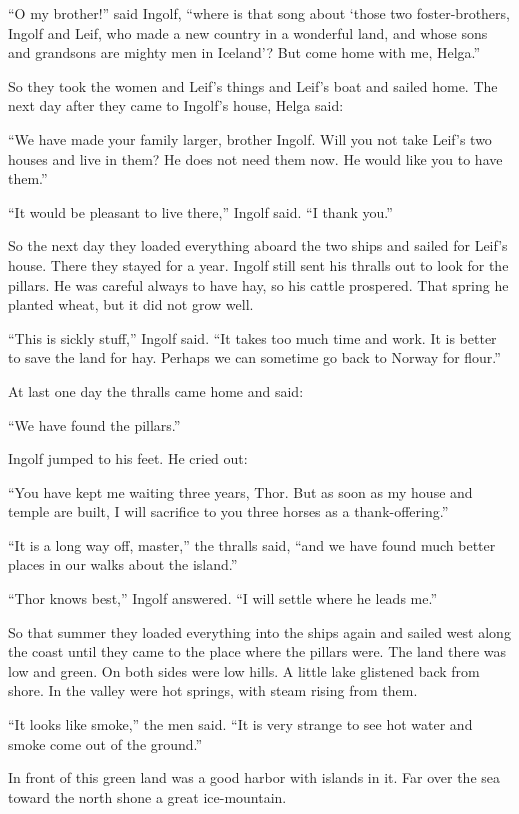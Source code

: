 ``O my brother!'' said Ingolf, ``where is that song about `those two
foster-brothers, Ingolf and Leif, who made a new country in a wonderful
land, and whose sons and grandsons are mighty men in Iceland'? But come
home with me, Helga.''

So they took the women and Leif's things and Leif's boat and sailed
home. The next day after they came to Ingolf's house, Helga said:

``We have made your family larger, brother Ingolf. Will you not take
Leif's two houses and live in them? He does not need them now. He would
like you to have them.''

``It would be pleasant to live there,'' Ingolf said. ``I thank you.''

So the next day they loaded everything aboard the two ships and sailed
for Leif's house. There they stayed for a year. Ingolf still sent his
thralls out to look for the pillars. He was careful always to have hay,
so his cattle prospered. That spring he planted wheat, but it did not
grow well.

``This is sickly stuff,'' Ingolf said. ``It takes too much time and
work. It is better to save the land for hay. Perhaps we can sometime go
back to Norway for flour.''

At last one day the thralls came home and said:

``We have found the pillars.''

Ingolf jumped to his feet. He cried out:

``You have kept me waiting three years, Thor. But as soon as my house
and temple are built, I will sacrifice to you three horses as a
thank-offering.''

``It is a long way off, master,'' the thralls said, ``and we have found
much better places in our walks about the island.''

``Thor knows best,'' Ingolf answered. ``I will settle where he leads
me.''

So that summer they loaded everything into the ships again and sailed
west along the coast until they came to the place where the pillars
were. The land there was low and green. On both sides were low hills. A
little lake glistened back from shore. In the valley were hot springs,
with steam rising from them.

``It looks like smoke,'' the men said. ``It is very strange to see hot
water and smoke come out of the ground.''

In front of this green land was a good harbor with islands in it. Far
over the sea toward the north shone a great ice-mountain.

